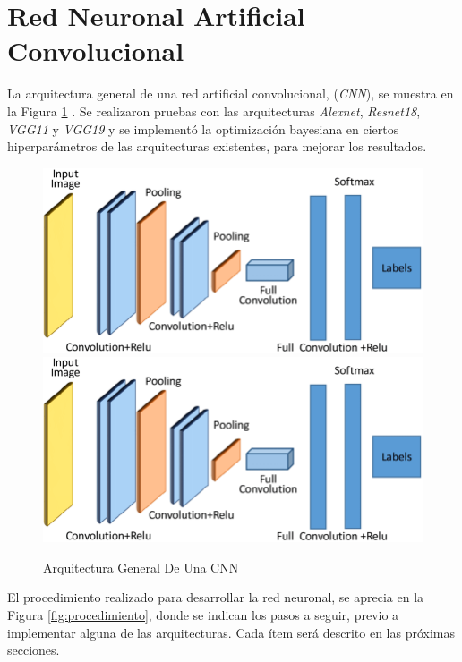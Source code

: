 	\section{Red Neuronal Artificial Convolucional}

	 La arquitectura general de una red artificial convolucional, (\textit{CNN}), se muestra en la Figura \ref{fig:cnnarchitecture} \cite{cnnarchitecture}. Se realizaron pruebas con las arquitecturas \textit{Alexnet}, \textit{Resnet18}, \textit{VGG11} y \textit{VGG19} y se implementó la optimización bayesiana en ciertos hiperparámetros de las arquitecturas existentes, para mejorar los resultados. 
	
	\begin{figure}[ht]
		\centering
		\includegraphics[scale=0.15]{Figs/A-generic-CNN-Architecture.png}
		\includegraphics[scale=0.18]{Figs/A-generic-CNN-Architecture.png}
		\caption{Arquitectura General De Una CNN}
		\label{fig:cnnarchitecture}
	\end{figure}	
	
	El procedimiento realizado para desarrollar la red neuronal, se aprecia en la Figura \ref{fig:procedimiento}, donde se indican los pasos a seguir, previo a implementar alguna de las arquitecturas. Cada ítem será descrito en las próximas secciones.  

